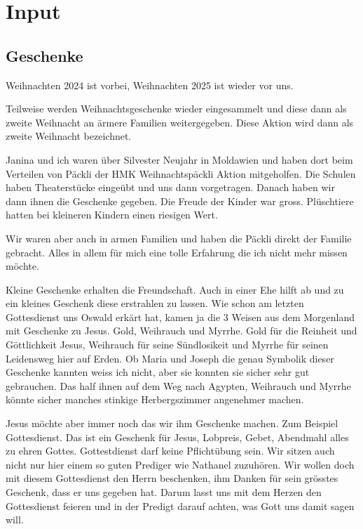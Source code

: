 \documentclass{../inc/mybib}
\begin{document}
\section{ Input }
\begin{spacing}{1.5}
\subsection{ Geschenke }

Weihnachten 2024 ist vorbei, Weihnachten 2025 ist wieder vor uns. 

Teilweise werden Weihnachtsgeschenke wieder eingesammelt und diese dann als zweite Weihnacht an ärmere Familien weitergegeben. Diese Aktion wird dann als zweite Weihnacht bezeichnet.

Janina und ich waren über Silvester Neujahr in Moldawien und haben dort beim Verteilen von Päckli der HMK Weihnachtspäckli Aktion mitgeholfen. Die Schulen haben Theaterstücke eingeübt und uns dann vorgetragen. Danach haben wir dann ihnen die Geschenke gegeben. Die Freude der Kinder war gross. Plüschtiere hatten bei kleineren Kindern einen riesigen Wert.

Wir waren aber auch in armen Familien und haben die Päckli direkt der Familie gebracht. Alles in allem für mich eine tolle Erfahrung die ich nicht mehr missen möchte.

Kleine Geschenke erhalten die Freundschaft. Auch in einer Ehe hilft ab und zu ein kleines Geschenk diese erstrahlen zu lassen. Wie schon am letzten Gottesdienst uns Oswald erkärt hat, kamen ja die 3 Weisen aus dem Morgenland mit Geschenke zu Jesus. Gold, Weihrauch und Myrrhe. Gold für die Reinheit und Göttlichkeit Jesus, Weihrauch für seine Sündlosikeit und Myrrhe für seinen Leidensweg hier auf Erden. Ob Maria und Joseph die genau Symbolik dieser Geschenke kannten weiss ich nicht, aber sie konnten sie sicher sehr gut gebrauchen. Das half ihnen auf dem Weg nach Agypten, Weihrauch und Myrrhe könnte sicher manches stinkige Herbergszimmer angenehmer machen.

Jesus möchte aber immer noch das wir ihm Geschenke machen. Zum Beispiel Gottesdienst. Das ist ein Geschenk für Jesus, Lobpreis, Gebet, Abendmahl alles zu ehren Gottes. Gottestdienst darf keine Pflichtübung sein. Wir sitzen auch nicht nur hier einem so guten Prediger wie Nathanel zuzuhören. Wir wollen doch mit diesem Gottesdienst den Herrn beschenken, ihm Danken für sein grösstes Geschenk, dass er uns gegeben hat. Darum lasst uns mit dem Herzen den Gottesdienst feieren und in der Predigt darauf achten, was Gott uns damit sagen will.


\end{spacing}
\end{document}
